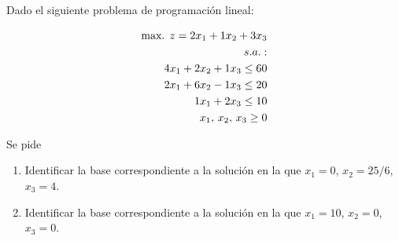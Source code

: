 Dado el siguiente problema de programación lineal:

\begin{equation}
\begin{split}
\mbox {max. }z=2x_1+1x_2+3x_3\\
s.a.:\\
4x_1+2x_2+1x_3 \leq 60\\
2x_1+6x_2 -1x_3 \leq 20\\
1x_1+2x_3 \leq 10\\
x_1,\,x_2,\,x_3 \geq 0
\notag
\end{split}
\end{equation}

Se pide
\begin{enumerate}[label=\alph*)]
    \item Identificar la base correspondiente a la solución  en la que $x_1=0$, $x_2=25/6$, $x_3=4$.

    \item Identificar la base correspondiente a la solución  en la que $x_1=10$, $x_2=0$, $x_3=0$.

\end{enumerate}
